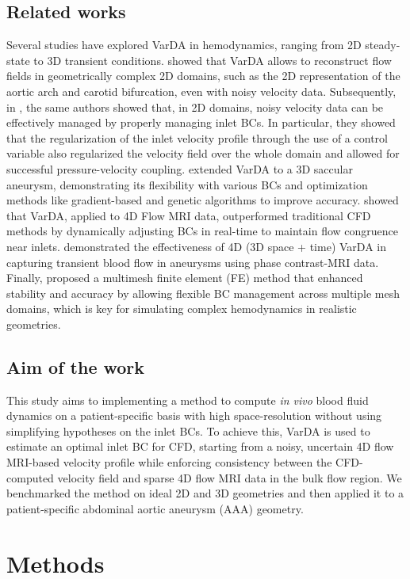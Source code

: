\subsection*{Related works}
\label{sec:background}
Several studies have explored VarDA in hemodynamics, ranging from 2D steady-state to 3D transient conditions. \cite{Delia2012} showed that VarDA allows to reconstruct flow fields in geometrically complex 2D domains, such as the 2D representation of the aortic arch and carotid bifurcation, even with noisy velocity data. Subsequently, in \cite{Delia2013}, the same authors showed that, in 2D domains, noisy velocity data can be effectively managed by properly managing inlet BCs. In particular, they showed that the regularization of the inlet velocity profile through the use of a control variable also regularized the velocity field over the whole domain and allowed for successful pressure-velocity coupling. \cite{Tiago2017} extended VarDA to a 3D saccular aneurysm, demonstrating its flexibility with various BCs and optimization methods like gradient-based and genetic algorithms to improve accuracy. \cite{Koltukluoglu2018} showed that VarDA, applied to 4D Flow MRI data, outperformed traditional CFD methods by dynamically adjusting BCs in real-time to maintain flow congruence near inlets. \cite{Funke2019} demonstrated the effectiveness of 4D (3D space + time) VarDA in capturing transient blood flow in aneurysms using phase contrast-MRI data. Finally, \cite{Dokken2020} proposed a multimesh finite element (FE) method that enhanced stability and accuracy by allowing flexible BC management across multiple mesh domains, which is key for simulating complex hemodynamics in realistic geometries.

\subsection*{Aim of the work}
This study aims to implementing a method to compute \textit{in vivo} blood fluid dynamics on a patient-specific basis with high space-resolution without using simplifying hypotheses on the inlet BCs. To achieve this, VarDA is used to estimate an optimal inlet BC for CFD, starting from a noisy, uncertain 4D flow MRI-based velocity profile while enforcing consistency between the CFD-computed velocity field and sparse 4D flow MRI data in the bulk flow region. We benchmarked the method on ideal 2D and 3D geometries and then applied it to a patient-specific abdominal aortic aneurysm (AAA) geometry. 

\section*{Methods}
\label{sec:methods}

